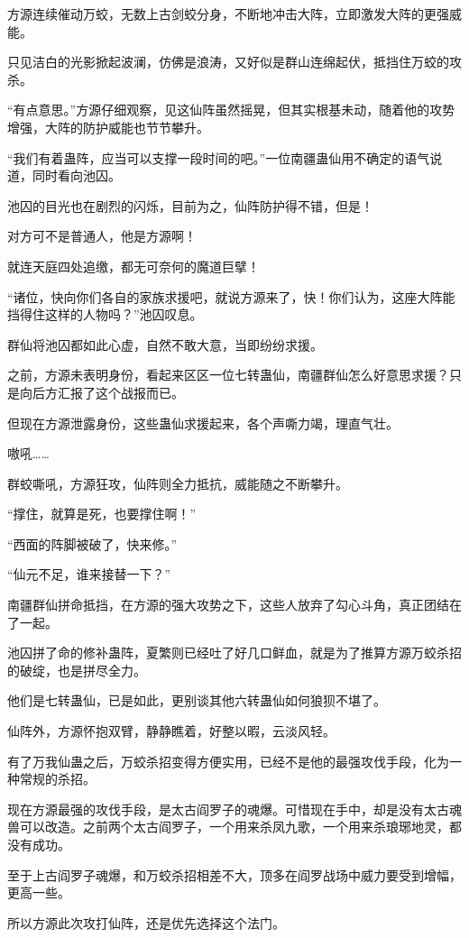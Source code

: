 \begin{this_body}
方源连续催动万蛟，无数上古剑蛟分身，不断地冲击大阵，立即激发大阵的更强威能。

只见洁白的光影掀起波澜，仿佛是浪涛，又好似是群山连绵起伏，抵挡住万蛟的攻杀。

“有点意思。”方源仔细观察，见这仙阵虽然摇晃，但其实根基未动，随着他的攻势增强，大阵的防护威能也节节攀升。

“我们有着蛊阵，应当可以支撑一段时间的吧。”一位南疆蛊仙用不确定的语气说道，同时看向池囚。

池囚的目光也在剧烈的闪烁，目前为之，仙阵防护得不错，但是！

对方可不是普通人，他是方源啊！

就连天庭四处追缴，都无可奈何的魔道巨擘！

“诸位，快向你们各自的家族求援吧，就说方源来了，快！你们认为，这座大阵能挡得住这样的人物吗？”池囚叹息。

群仙将池囚都如此心虚，自然不敢大意，当即纷纷求援。

之前，方源未表明身份，看起来区区一位七转蛊仙，南疆群仙怎么好意思求援？只是向后方汇报了这个战报而已。

但现在方源泄露身份，这些蛊仙求援起来，各个声嘶力竭，理直气壮。

嗷吼……

群蛟嘶吼，方源狂攻，仙阵则全力抵抗，威能随之不断攀升。

“撑住，就算是死，也要撑住啊！”

“西面的阵脚被破了，快来修。”

“仙元不足，谁来接替一下？”

南疆群仙拼命抵挡，在方源的强大攻势之下，这些人放弃了勾心斗角，真正团结在了一起。

池囚拼了命的修补蛊阵，夏繁则已经吐了好几口鲜血，就是为了推算方源万蛟杀招的破绽，也是拼尽全力。

他们是七转蛊仙，已是如此，更别谈其他六转蛊仙如何狼狈不堪了。

仙阵外，方源怀抱双臂，静静瞧着，好整以暇，云淡风轻。

有了万我仙蛊之后，万蛟杀招变得方便实用，已经不是他的最强攻伐手段，化为一种常规的杀招。

现在方源最强的攻伐手段，是太古阎罗子的魂爆。可惜现在手中，却是没有太古魂兽可以改造。之前两个太古阎罗子，一个用来杀凤九歌，一个用来杀琅琊地灵，都没有成功。

至于上古阎罗子魂爆，和万蛟杀招相差不大，顶多在阎罗战场中威力要受到增幅，更高一些。

所以方源此次攻打仙阵，还是优先选择这个法门。


\end{this_body}
